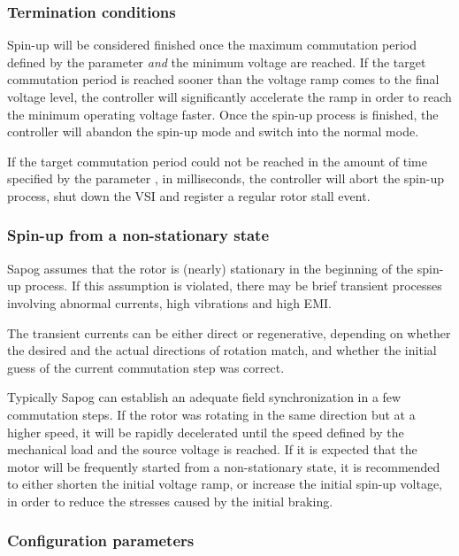 \documentclass{zubaxdoc}
\begin{document}
\subsubsection{Termination conditions}

Spin-up will be considered finished once the maximum commutation period defined by the parameter
 \emph{and} the minimum voltage  are reached.
If the target commutation period is reached sooner than the voltage ramp comes to the final
voltage level, the controller will significantly accelerate the ramp in order to reach
the minimum operating voltage faster.
Once the spin-up process is finished,
the controller will abandon the spin-up mode and switch into the normal mode.

If the target commutation period could not be reached in the amount of time specified by
the parameter , in milliseconds, the controller will abort the spin-up process,
shut down the VSI and register a regular rotor stall event.

\subsubsection{Spin-up from a non-stationary state}

Sapog assumes that the rotor is (nearly) stationary in the beginning of the spin-up process.
If this assumption is violated, there may be brief transient processes involving abnormal currents,
high vibrations and high EMI.

The transient currents can be either direct or regenerative, depending on whether the desired
and the actual directions of rotation match, and whether the initial guess of the current
commutation step was correct.

Typically Sapog can establish an adequate field synchronization in a few commutation steps.
If the rotor was rotating in the same direction but at a higher speed,
it will be rapidly decelerated until the speed defined by the mechanical load and the source voltage is
reached.
If it is expected that the motor will be frequently started from a non-stationary state,
it is recommended to either shorten the initial voltage ramp, or increase the initial
spin-up voltage, in order to reduce the stresses caused by the initial braking.

\subsubsection{Configuration parameters}
\end{document}
